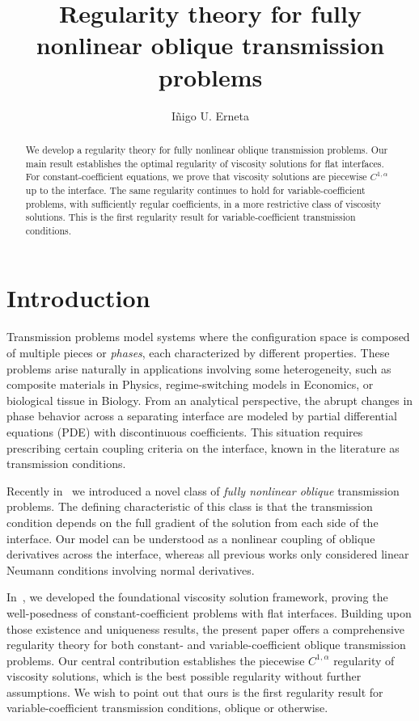 \documentclass[letter,11pt]{amsart}
\author[I. U. Erneta]{I\~{n}igo U. Erneta}
\title{Regularity theory for fully nonlinear oblique transmission problems}
\theoremstyle{definition}
\numberwithin{equation}{section}
\begin{document}
\begin{abstract}
We develop a regularity theory for fully nonlinear oblique transmission problems.
Our main result establishes the optimal regularity of viscosity solutions for flat interfaces.
For constant-coefficient equations, we prove that viscosity solutions are piecewise $C^{1,\alpha}$ up to the interface.
The same regularity continues to hold for variable-coefficient problems, with sufficiently regular coefficients, in a more restrictive class of viscosity solutions.
This is the first regularity result for variable-coefficient transmission conditions.
\end{abstract}

\maketitle

\tableofcontents

\section{Introduction}

Transmission problems model systems where the configuration space is composed of multiple pieces or \emph{phases}, each characterized by different properties.
These problems arise naturally in applications involving some heterogeneity, such as composite materials in Physics, regime-switching models in Economics, or biological tissue in Biology.
From an analytical perspective, the abrupt changes in phase behavior across a separating interface are modeled by partial differential equations (PDE) with discontinuous coefficients.
This situation requires prescribing certain coupling criteria on the interface, known in the literature as transmission conditions.

\medskip

Recently in~\cite{E} we introduced a novel class of \emph{fully nonlinear oblique} transmission problems.
The defining characteristic of this class is that the transmission condition depends on the full gradient of the solution from each side of the interface.
Our model can be understood as a nonlinear coupling of oblique derivatives across the interface, whereas all previous works only considered linear Neumann conditions involving normal derivatives.

\medskip

In~\cite{E}, we developed the foundational viscosity solution framework, proving the well-posedness of constant-coefficient problems with flat interfaces.
Building upon those existence and uniqueness results, the present paper offers a comprehensive regularity theory for both constant- and variable-coefficient oblique transmission problems. 
Our central contribution establishes the piecewise $C^{1,\alpha}$ regularity of viscosity solutions, which is the best possible regularity without further assumptions.
We wish to point out that ours is the first regularity result for variable-coefficient transmission conditions, oblique or otherwise.
\end{document}
